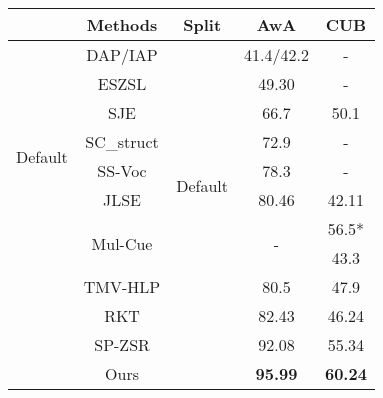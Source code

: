 \documentclass{article}
\begin{document}
\begin{table}[t]
\centering
\begin{tabular}{c|c|c|c|c}
\bottomrule
                         & Methods                     & Split                                                          & AwA                & CUB            \\ \toprule
\multirow{8}{*}{\begin{turn}{90}Default\end{turn}}
                         & DAP/IAP                    &                                                                & 41.4/42.2         & -              \\ \cline{2-2} \cline{4-5}
                         & ESZSL                      &           \multirow{8}{*}{Default}                          & 49.30              & -              \\ \cline{2-2} \cline{4-5}
                         & SJE                 &                                                                & 66.7             & 50.1          \\ \cline{2-2} \cline{4-5}
                         & SC\_struct                &                                            & 72.9               & -          \\ \cline{2-2} \cline{4-5}
                         & SS-Voc                      &                                                                & 78.3               & -              \\ \cline{2-2} \cline{4-5}
                         & JLSE                       &                                                        & 80.46              & 42.11          \\ \cline{2-2} \cline{4-5}
                         & \multirow{2}{*}{Mul-Cue} &                                                                & \multirow{2}{*}{-} & 56.5*          \\ \cline{5-5}
                         &                             &                                                                &                    & 43.3           \\ \cline{2-2} \cline{4-5}
                         & TMV-HLP                    &                                                                & 80.5               & 47.9           \\ \cline{2-2} \cline{4-5}
                         & RKT                        &                                                & 82.43              & 46.24          \\ \cline{2-2} \cline{4-5}
                         & SP-ZSR                &                                                                & 92.08              & 55.34          \\ \cline{2-2} \cline{4-5}
                         & Ours                        &                                                                & \textbf{95.99}     & \textbf{60.24} \\ \midrule


\end{tabular}
\end{table}
\end{document}
